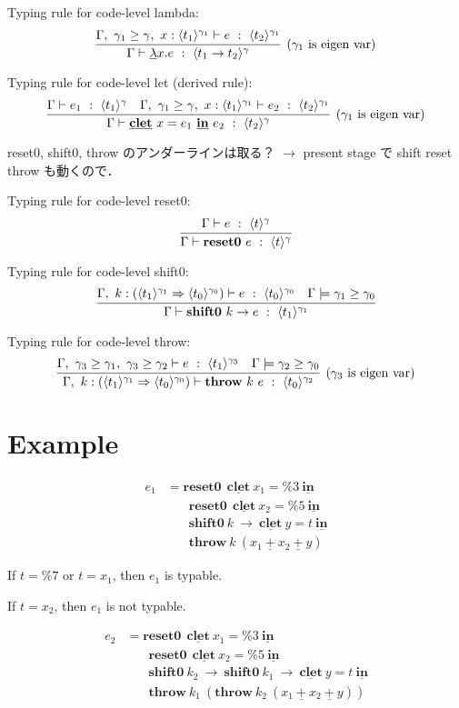 \documentclass[10pt,a4j]{jarticle}
\newcommand\Resetz{\textbf{reset0}}
\newcommand\Shiftz{\textbf{shift0}}
\newcommand\Throw{\textbf{throw}}
\newcommand\resetz[1]{\Resetz~{#1}}
\newcommand\shiftz[2]{\Shiftz~{#1}\to{#2}}
\newcommand\throw[2]{\Throw~{#1}~{#2}}
\newcommand\cfun[2]{\underline{\lambda}{#1}.{#2}}
\newcommand\cPlus{\underline{\textbf{+}}}
\newcommand\cLet{\underline{\textbf{clet}}}
\newcommand\cIn{\underline{\textbf{in}}}
\newcommand\clet[3]{\cLet~{#1}={#2}~\cIn~{#3}}
\newcommand\csp[1]{\texttt{\%}{#1}}
\newcommand\codeT[2]{\langle{#1}\rangle^{#2}}
\newcommand\contT[2]{({#1} \Rightarrow {#2})}
\newcommand\ord{\ge}
\theoremstyle{break}
\begin{document}
Typing rule for code-level lambda:
\[
  \infer[(\gamma_1~\text{is eigen var})]
  {\Gamma \vdash \cfun{x}{e} ~:~ \codeT{t_1\to t_2}{\gamma}}
  {\Gamma,~\gamma_1 \ord \gamma,~x:\codeT{t_1}{\gamma_1} \vdash e
    ~:~ \codeT{t_2}{\gamma_1}}
\]

Typing rule for code-level let (derived rule):
\[
  \infer[(\gamma_1~\text{is eigen var})]
  {\Gamma \vdash \clet{x}{e_1}{e_2} ~:~ \codeT{t_2}{\gamma}}
  {\Gamma \vdash e_1 ~:~ \codeT{t_1}{\gamma}
    &\Gamma,~\gamma_1 \ord \gamma,~x:\codeT{t_1}{\gamma_1} \vdash
    e_2 ~:~ \codeT{t_2}{\gamma_1}
  }
\]

reset0, shift0, throw のアンダーラインは取る？
$\rightarrow$ present stage で shift reset throw も動くので．

Typing rule for code-level reset0:
\[
  \infer{\Gamma \vdash \resetz{e} ~:~ \codeT{t}{\gamma}}
  {\Gamma \vdash e ~:~ \codeT{t}{\gamma}}
\]

Typing rule for code-level shift0:
\[
  \infer{\Gamma \vdash \shiftz{k}{e} ~:~ \codeT{t_1}{\gamma_1}}
  {\Gamma,~k:\contT{\codeT{t_1}{\gamma_1}}{\codeT{t_0}{\gamma_0}}
    \vdash e ~:~ \codeT{t_0}{\gamma_0}
    & \Gamma \models \gamma_1 \ord \gamma_0
  }
\]

Typing rule for code-level throw:
\[
  \infer[(\gamma_3~\text{is eigen var})]
  {\Gamma,~k:\contT{\codeT{t_1}{\gamma_1}}{\codeT{t_0}{\gamma_0}}
    \vdash \throw{k}{e} ~:~ \codeT{t_0}{\gamma_2}}
  {\Gamma,~
    \gamma_3 \ord \gamma_1,~
    \gamma_3 \ord \gamma_2
    \vdash e ~:~ \codeT{t_1}{\gamma_3}
    & \Gamma \models \gamma_2 \ord \gamma_0
  }
\]


\section{Example}

\begin{align*}
  e_1 & = \Resetz ~~\cLet~x_1=\csp{3}~\cIn \\
      & \phantom{=}~~ \Resetz ~~\cLet~x_2=\csp{5}~\cIn \\
      & \phantom{=}~~ \Shiftz~k~\to~\cLet~y=t~\cIn \\
      & \phantom{=}~~ \Throw~k~(x_1~\cPlus~x_2~\cPlus~y)
\end{align*}

If $t=\csp{7}$ or $t=x_1$, then $e_1$ is typable.

If $t=x_2$, then $e_1$ is not typable.

\begin{align*}
  e_2 & = \Resetz ~~\cLet~x_1=\csp{3}~\cIn \\
      & \phantom{=}~~ \Resetz ~~\cLet~x_2=\csp{5}~\cIn \\
      & \phantom{=}~~ \Shiftz~k_2~\to~ \Shiftz~k_1~\to~ \cLet~y=t~\cIn \\
      & \phantom{=}~~ \Throw~k_1~(\Throw~k_2~(x_1~\cPlus~x_2~\cPlus~y))
\end{align*}
\end{document}
